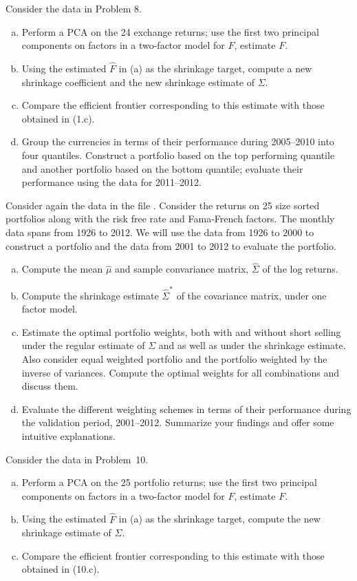 \prob Consider the data in Problem 8.
	\begin{enumerate}[(a)]
	\item Perform a PCA on the 24 exchange returns; use the first two principal components on factors in a two-factor model for $F$, estimate $F$.
	\item Using the estimated $\hat{F}$ in (a) as the shrinkage target, compute a new shrinkage coefficient and the new shrinkage estimate of $\Sigma$. 
	\item Compare the efficient frontier corresponding to this estimate with those obtained in (1.c). 
	\item Group the currencies in terms of their performance during 2005--2010 into four quantiles. Construct a portfolio based on the top performing quantile and another portfolio based on the bottom quantile; evaluate their performance using the data for 2011--2012. \twomedskip
	\end{enumerate}


\prob Consider again the data in the file . Consider the returns on 25 size sorted portfolios along with the risk free rate and Fama-French factors. The monthly data spans from 1926 to 2012. We will use the data from 1926 to 2000 to construct a portfolio and the data from 2001 to 2012 to evaluate the portfolio. 
	\begin{enumerate}[(a)]
	\item Compute the mean $\hat{\mu}$ and sample convariance matrix, $\hat{\Sigma}$ of the log returns.
	\item Compute the shrinkage estimate $\hat{\Sigma}^*$ of the covariance matrix, under one factor model.
	\item Estimate the optimal portfolio weights, both with and without short selling under the regular estimate of $\Sigma$ and as well as under the shrinkage estimate. Also consider equal weighted portfolio and the portfolio weighted by the inverse of variances. Compute the optimal weights for all combinations and discuss them.
	\item Evaluate the different weighting schemes in terms of their performance during the validation period, 2001--2012. Summarize your findings and offer some intuitive explanations. \twomedskip
	\end{enumerate}


\prob Consider the data in Problem~10.
	\begin{enumerate}[(a)]
	\item Perform a PCA on the 25 portfolio returns; use the first two principal components on factors in a two-factor model for $F$, estimate $F$.
	\item Using the estimated $\hat{F}$ in (a) as the shrinkage target, compute the new shrinkage estimate of $\Sigma$.
	\item Compare the efficient frontier corresponding to this estimate with those obtained in (10.c). \twomedskip
	\end{enumerate}